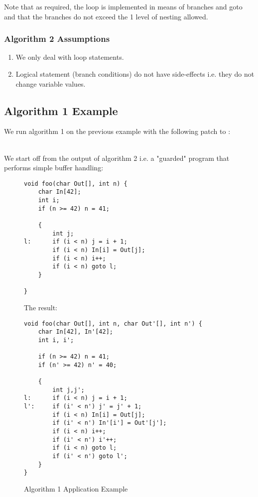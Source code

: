 Note that as required, the loop is implemented in means of branches and goto and that the branches do not exceed the 1 level of nesting allowed.

\subsubsection{Algorithm 2 Assumptions}
\begin{enumerate}
\item We only deal with  loop statements.
\item Logical statement (branch conditions) do not have side-effects i.e. they do not change variable values.
\end{enumerate}


\subsection{Algorithm 1 Example} \label{SubSec:UnionAlgEx}

We run algorithm 1 on the previous example with the following patch to :\\
{\color{Gray}} \\
{\color{Blue}}

We start off from the output of algorithm 2 i.e. a "guarded" program that performs simple buffer handling:
\begin{figure}[H]
\begin{lstlisting}
void foo(char Out[], int n) {
    char In[42];
    int i;
    if (n >= 42) n = 41;

    {
        int j;
l:      if (i < n) j = i + 1;
        if (i < n) In[i] = Out[j];
        if (i < n) i++;
        if (i < n) goto l;
    }

}
\end{lstlisting}
The result:
\begin{lstlisting}
void foo(char Out[], int n, char Out'[], int n') {
    char In[42], In'[42];
    int i, i';

    if (n >= 42) n = 41;
    if (n' >= 42) n' = 40;

    {
        int j,j';
l:      if (i < n) j = i + 1;
l':     if (i' < n') j' = j' + 1;
        if (i < n) In[i] = Out[j];
        if (i' < n') In'[i'] = Out'[j'];
        if (i < n) i++;
        if (i' < n') i'++;
        if (i < n) goto l;
        if (i' < n') goto l';
    }
}
\end{lstlisting} \caption{Algorithm 1 Application Example}
\end{figure}

